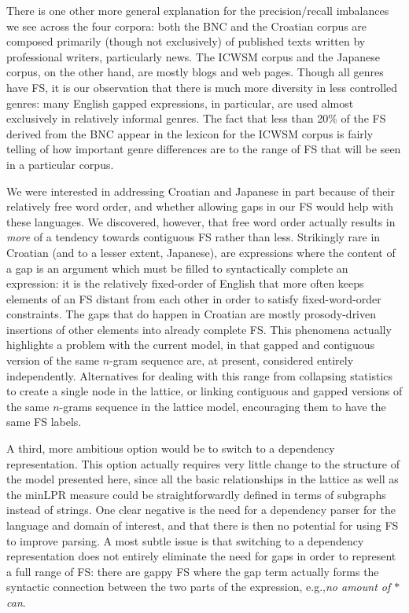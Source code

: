 \documentclass[11pt,letterpaper]{article}
\makeatletter
\def \eg {e.g.,\@ }
\newcommand{\gap}{$*$\xspace}
\newcommand{\ex}[1]{\textit{#1}\xspace}
\makeatother
\begin{document}
There is one other more general explanation for the precision/recall imbalances we see across the four corpora: both the BNC and the Croatian corpus are composed primarily (though not exclusively) of published texts written by professional writers, particularly news. The ICWSM corpus and the Japanese corpus, on the other hand, are mostly blogs and web pages. Though all genres have FS, it is our observation that there is much more diversity in less controlled genres: many English gapped expressions, in particular, are used almost exclusively in relatively informal genres. The fact that less than 20\% of the FS derived from the BNC appear in the lexicon for the ICWSM corpus is fairly telling of how important genre differences are to the range of FS that will be seen in a particular corpus.

We were interested in addressing Croatian and Japanese in part because of their relatively free word order, and whether allowing gaps in our FS would help with these languages. We discovered, however, that free word order actually results in \emph{more} of a tendency towards contiguous FS rather than less. Strikingly rare in Croatian (and to a lesser extent, Japanese), are expressions where the content of a gap is an argument which must be filled to syntactically complete an expression: it is the relatively fixed-order of English that more often keeps elements of an FS distant from each other in order to satisfy fixed-word-order constraints. The gaps that do happen in Croatian are mostly prosody-driven insertions of other elements into already complete FS. This phenomena actually highlights a problem with the current model, in that gapped and contiguous version of the same $n$-gram sequence are, at present, considered entirely independently. Alternatives for dealing with this range from collapsing statistics to create a single node in the lattice, or linking contiguous and gapped versions of the same $n$-grams sequence in the lattice model, encouraging them to have the same FS labels.

A third, more ambitious option would be to switch to a dependency representation. This option actually requires very little change to the structure of the model presented here, since all the basic relationships in the lattice as well as the minLPR measure could be straightforwardly defined in terms of subgraphs instead of strings. One clear negative is the need for a dependency parser for the language and domain of interest, and that there is then no potential for using FS to improve parsing. A most subtle issue is that switching to a dependency representation does not entirely eliminate the need for gaps in order to represent a full range of FS: there are gappy FS where the gap term actually forms the syntactic connection between the two parts of the expression, \eg \ex{no amount of \gap can}.
\end{document}
